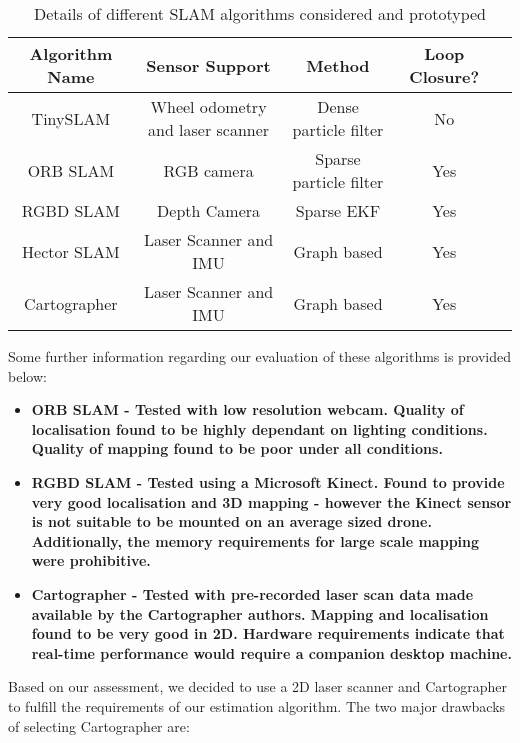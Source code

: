 \documentclass[capstone_report.tex]{subfiles}
\begin{document}
\begin{table}[H]
	\centering
 	\begin{tabular}{|c|c|c|c|c|}
 		\hline
 		\bf{Algorithm Name}	&	\bf{Sensor Support}	&	\bf{Method}	&	\bf{Loop Closure?}\\
 		\hline
 		TinySLAM		&	Wheel odometry and laser scanner	&	Dense particle filter &	No\\	
 		\hline
 		ORB SLAM 	&		RGB camera & Sparse particle filter & Yes \\
 		\hline
 		RGBD SLAM & Depth Camera & Sparse EKF & Yes\\
 		\hline
 		Hector SLAM & Laser Scanner and IMU & Graph based & Yes\\
 		\hline
 		Cartographer & Laser Scanner and IMU & Graph based & Yes\\
 		\hline
 	\end{tabular}
 	\caption{Details of different SLAM algorithms considered and prototyped\label{tab:slamAlg}}
\end{table}

Some further information regarding our evaluation of these algorithms is provided below:
\begin{itemize}
	\item \bf{ORB SLAM} \normalfont- Tested with low resolution webcam. Quality of localisation found to be highly dependant on lighting conditions. Quality of mapping found to be poor under all conditions.
 	\item \bf{RGBD SLAM} \normalfont- Tested using a Microsoft Kinect. Found to provide very good localisation and 3D mapping - however the Kinect sensor is not suitable to be mounted on an average sized drone. Additionally, the memory requirements for large scale mapping were prohibitive.
 	\item \bf{Cartographer} \normalfont- Tested with pre-recorded laser scan data made available by the Cartographer authors\cite{cartdata}. Mapping and localisation found to be very good in 2D. Hardware requirements indicate that real-time performance would require a companion desktop machine.
\end{itemize}

Based on our assessment, we decided to use a 2D laser scanner and Cartographer to fulfill the requirements of our estimation algorithm.  The two major drawbacks of selecting Cartographer are:
\end{document}
